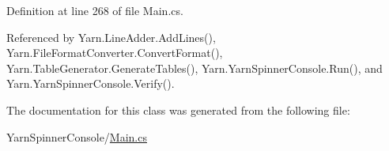 Definition at line 268 of file Main.\-cs.



Referenced by Yarn.\-Line\-Adder.\-Add\-Lines(), Yarn.\-File\-Format\-Converter.\-Convert\-Format(), Yarn.\-Table\-Generator.\-Generate\-Tables(), Yarn.\-Yarn\-Spinner\-Console.\-Run(), and Yarn.\-Yarn\-Spinner\-Console.\-Verify().



The documentation for this class was generated from the following file\-:\begin{DoxyCompactItemize}
\item 
Yarn\-Spinner\-Console/\hyperlink{a00303}{Main.\-cs}\end{DoxyCompactItemize}
